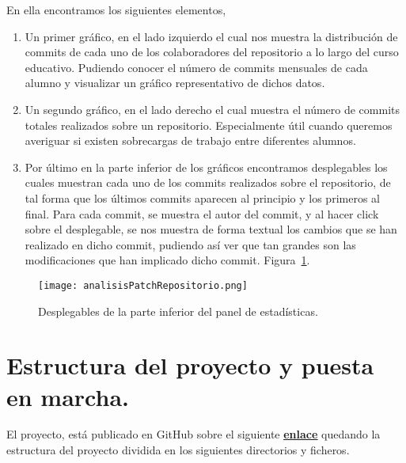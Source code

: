     En ella encontramos los siguientes elementos,
    \begin{enumerate}
      \item Un primer gráfico, en el lado izquierdo el cual nos muestra la distribución de commits de cada uno de los colaboradores del repositorio a lo largo del curso educativo. Pudiendo conocer el número de commits mensuales de cada alumno y visualizar un gráfico representativo de dichos datos.
      \item Un segundo gráfico, en el lado derecho el cual muestra el número de commits totales realizados sobre un repositorio. Especialmente útil cuando queremos averiguar si existen sobrecargas de trabajo entre diferentes alumnos.
      \item Por último en la parte inferior de los gráficos encontramos desplegables los cuales muestran cada uno de los commits realizados sobre el repositorio, de tal forma que los últimos commits aparecen al principio y los primeros al final. Para cada commit, se muestra el autor del commit, y al hacer click sobre el desplegable, se nos muestra de forma textual los cambios que se han realizado en dicho commit, pudiendo así ver que tan grandes son las modificaciones que han implicado dicho commit. Figura~\ref{figure:imagenPatch}.
    \end{enumerate}

    \begin{figure}[h!]
      \texttt{[image: analisisPatchRepositorio.png]}
      \caption{Desplegables de la parte inferior del panel de estadísticas.}
      \label{figure:imagenPatch}
    \end{figure}

\chapter{Estructura del proyecto y puesta en marcha.\label{09manual}}

El proyecto, está publicado en GitHub sobre el siguiente \textbf{\href{https://github.com/JuanPedroMartinez/TFG-NODE}{\underline{enlace}}} quedando la estructura del proyecto dividida en los siguientes directorios y ficheros.

